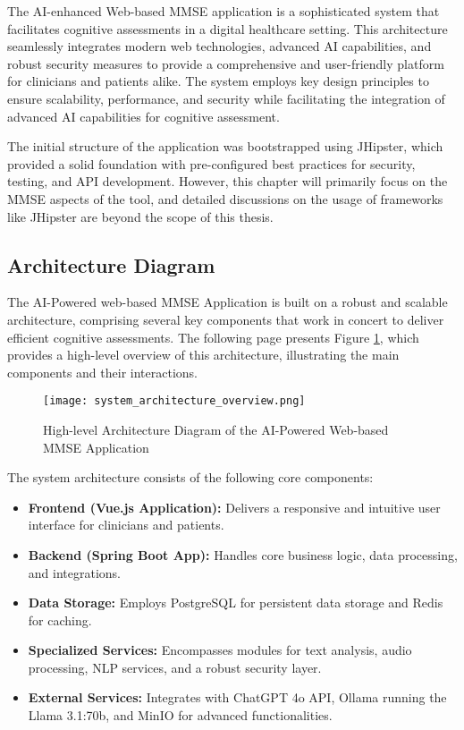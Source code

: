The AI-enhanced Web-based MMSE application is a sophisticated system that facilitates cognitive assessments in a digital healthcare setting. This architecture seamlessly integrates modern web technologies, advanced AI capabilities, and robust security measures to provide a comprehensive and user-friendly platform for clinicians and patients alike. The system employs key design principles to ensure scalability, performance, and security while facilitating the integration of advanced AI capabilities for cognitive assessment.

The initial structure of the application was bootstrapped using JHipster, which provided a solid foundation with pre-configured best practices for security, testing, and API development. However, this chapter will primarily focus on the MMSE aspects of the tool, and detailed discussions on the usage of frameworks like JHipster are beyond the scope of this thesis.

\subsection{Architecture Diagram}
The AI-Powered web-based MMSE Application is built on a robust and scalable architecture, comprising several key components that work in concert to deliver efficient cognitive assessments. The following page presents Figure \ref{fig:high-level-architecture}, which provides a high-level overview of this architecture, illustrating the main components and their interactions.
\begin{figure}[p]
\begin{center}
\texttt{[image: system\_architecture\_overview.png]}
\caption{High-level Architecture Diagram of the AI-Powered Web-based MMSE Application}
\label{fig:high-level-architecture}
\end{center}
\end{figure}
The system architecture consists of the following core components:
\begin{itemize}
\item \textbf{Frontend (Vue.js Application):} Delivers a responsive and intuitive user interface for clinicians and patients.
\item \textbf{Backend (Spring Boot App):} Handles core business logic, data processing, and integrations.
\item \textbf{Data Storage:} Employs PostgreSQL for persistent data storage and Redis for caching.
\item \textbf{Specialized Services:} Encompasses modules for text analysis, audio processing, NLP services, and a robust security layer.
\item \textbf{External Services:} Integrates with ChatGPT 4o API, Ollama running the Llama 3.1:70b, and MinIO for advanced functionalities.
\end{itemize}

